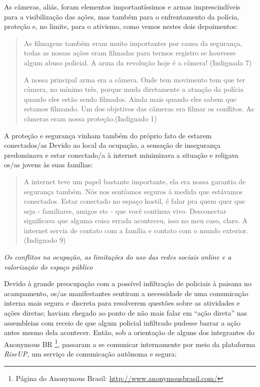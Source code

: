 As câmeras, aliás, foram elementos importantíssimos e armas
imprescindíveis para a visibilização das ações, mas também para o
enfrentamento da polícia, proteção e, no limite, para o ativismo, como
vemos nestes dois depoimentos:

\begin{quote}
As filmagens também eram muito importantes por causa da segurança, todas
as nossas ações eram filmadas para termos registro se houvesse algum
abuso policial. A arma da revolução hoje é a câmera! (Indignada 7)

A nossa principal arma era a câmera. Onde tem movimento tem que ter
câmera, no mínimo três, porque muda diretamente a atuação da polícia
quando eles estão sendo filmados. Ainda mais quando eles sabem que
estamos filmando. Um dos objetivos das câmeras era filmar os conflitos.
As câmeras eram nossa proteção.(Indignado 1)
\end{quote}

A proteção e segurança vinham também do próprio fato de estarem
conectados/as Devido ao local da ocupação, a sensação de insegurança
predominava e estar conectado/a à internet minimizava a situação e
religava os/as jovens às suas famílias:

\begin{quote}
A internet teve um papel bastante importante, ela era nossa garantia de
segurança também. Nós nos sentíamos seguros à medida que estávamos
conectados. Estar conectado no espaço hostil, é falar pra quem quer que
seja - familiares, amigos etc - que você continua vivo. Desconectar
significava que alguma coisa errada aconteceu, isso no meu caso, claro.
A internet servia de contato com a família e contato com o mundo
exterior. (Indignado 9)
\end{quote}

\emph{Os conflitos na ocupação, as limitações do uso das redes sociais
online e a valorização do espaço público}

Devido à grande preocupação com a possível infiltração de policiais à
paisana no acampamento, os/as manifestantes sentiram a necessidade de
uma comunicação interna mais segura e discreta para resolverem questões
sobre as atividades e ações diretas; haviam chegado ao ponto de não mais
falar em ``ação direta'' nas assembleias com receio de que algum
policial infiltrado pudesse barrar a ação antes mesmo dela acontecer.
Então, sob a orientação de alguns dos integrantes do Anonymous BR
\footnote{Página do Anonymous Brasil:
  \url{http://www.anonymousbrasil.com/}}, passaram a se comunicar
internamente por meio da plataforma \emph{RiseUP,} um serviço de
comunicação autônoma e segura:

